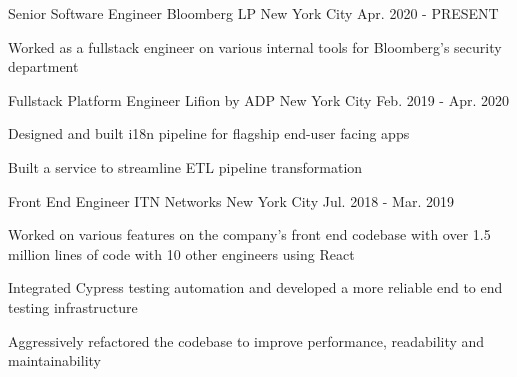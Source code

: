 

\begin{cventries}

  \cventry
    {Senior Software Engineer} %
    {Bloomberg LP} %
    {New York City} %
    {Apr. 2020 - PRESENT} %
    {
      \begin{cvitems} %
        \item {Worked as a fullstack engineer on various internal tools for Bloomberg's security department}
      \end{cvitems}
    }

  \cventry
    {Fullstack Platform Engineer} %
    {Lifion by ADP} %
    {New York City} %
    {Feb. 2019 - Apr. 2020} %
    {
      \begin{cvitems} %
        \item {Designed and built i18n pipeline for flagship end-user facing apps}
        \item {Built a service to streamline ETL pipeline transformation}
      \end{cvitems}
    }

  \cventry
    {Front End Engineer} %
    {ITN Networks} %
    {New York City} %
    {Jul. 2018 - Mar. 2019} %
    {
      \begin{cvitems} %
        \item {Worked on various features on the company's front end codebase with over 1.5 million lines of code with 10 other engineers using React}
        \item {Integrated Cypress testing automation and developed a more reliable end to end testing infrastructure} 
        \item {Aggressively refactored the codebase to improve performance, readability and maintainability} 
      \end{cvitems}
    }


\end{cventries}
